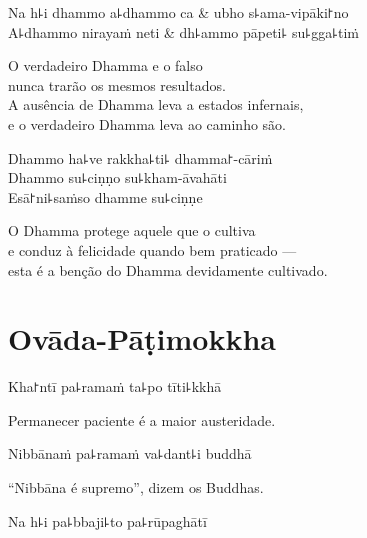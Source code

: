 \clearpage

\begin{twochants}
  Na h꜕i dhammo a꜕dhammo ca & ubho s꜕ama-vipāki꜓no \\
  A꜕dhammo nirayaṁ neti & dh꜕ammo pāpeti꜕ su꜕gga꜕tiṁ \\
\end{twochants}

\begin{english}
  O verdadeiro Dhamma e o falso\\
  nunca trarão os mesmos resultados.\\
  A ausência de Dhamma leva a estados infernais,\\
  e o verdadeiro Dhamma leva ao caminho são.
\end{english}

Dhammo ha꜕ve rakkha꜕ti꜕ dhamma꜓-cāriṁ\\
Dhammo su꜕ciṇṇo su꜕kham-āvahāti\\
Esā꜓ni꜕saṁso dhamme su꜕ciṇṇe

\begin{english}
  O Dhamma protege aquele que o cultiva\\
  e conduz à felicidade quando bem praticado ---\\
  esta é a benção do Dhamma devidamente cultivado.
\end{english}

\chapter{Ovāda-Pāṭimokkha}


\enlargethispage{\baselineskip}

\begin{leader}
\end{leader}

Kha꜓ntī pa꜕ramaṁ ta꜕po tīti꜕kkhā

\begin{english}
  Permanecer paciente é a maior austeridade.
\end{english}

Nibbānaṁ pa꜕ramaṁ va꜕dant꜕i buddhā

\begin{english}
  “Nibbāna é supremo”, dizem os Buddhas.
\end{english}

Na h꜕i pa꜕bbaji꜕to pa꜕rūpaghātī

